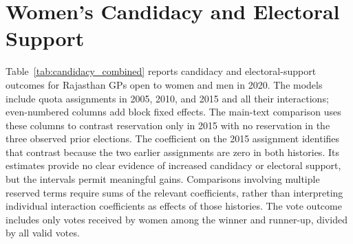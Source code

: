 \clearpage
\section{Women's Candidacy and Electoral Support}\label{sec:app_outcomes}
\suppressfloats[t]

Table~\ref{tab:candidacy_combined} reports candidacy and electoral-support outcomes for Rajasthan GPs open to women and men in 2020. The models include quota assignments in 2005, 2010, and 2015 and all their interactions; even-numbered columns add block fixed effects. The main-text comparison uses these columns to contrast reservation only in 2015 with no reservation in the three observed prior elections. The coefficient on the 2015 assignment identifies that contrast because the two earlier assignments are zero in both histories. Its estimates provide no clear evidence of increased candidacy or electoral support, but the intervals permit meaningful gains. Comparisons involving multiple reserved terms require sums of the relevant coefficients, rather than interpreting individual interaction coefficients as effects of those histories. The vote outcome includes only votes received by women among the winner and runner-up, divided by all valid votes.


\FloatBarrier
